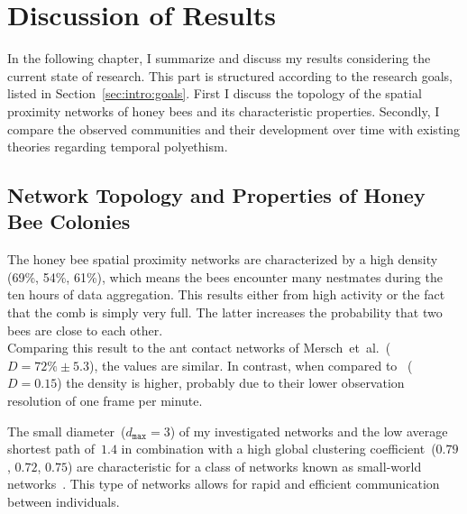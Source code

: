 \section{Discussion of Results}

In the following chapter, I summarize and discuss my results considering the current state of research.
This part is structured according to the research goals, listed in Section~\ref{sec:intro:goals}.
First I discuss the topology of the spatial proximity networks of honey bees and its characteristic properties.
Secondly, I compare the observed communities and their development over time with existing theories regarding temporal polyethism.


\subsection{Network Topology and Properties of Honey Bee Colonies}
The honey bee spatial proximity networks are characterized by a high density (69\%, 54\%, 61\%), which means the bees encounter many nestmates during the ten hours of data aggregation.
This results either from high activity or the fact that the comb is simply very full.
The latter increases the probability that two bees are close to each other.\\
Comparing this result to the ant contact networks of Mersch~et~al.\cite{mersch2013tracking}~($D=72\%\pm5.3$), the values are similar.
In contrast, when compared to \textcite{baracchi2014socio}~($D=0.15$) the density is higher, probably due to their lower observation resolution of one frame per minute.


The small diameter~($d_{\texttt{max}}=3$) of my investigated networks and the low average shortest path of~$1.4$ in combination with a high global clustering coefficient~($0.79$, $0.72$, $0.75$) are characteristic for a class of networks known as small-world networks~\cite{telesford2011ubiquity}.
This type of networks allows for rapid and efficient communication between individuals.


